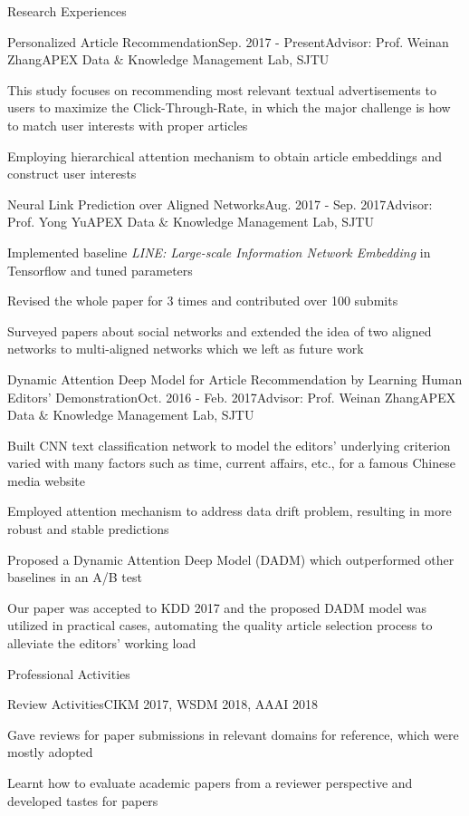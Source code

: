 \documentclass{resume} %
\begin{document}
\begin{rSection}{Research Experiences}
\begin{rSubsection}{Personalized Article Recommendation}{Sep. 2017 - Present}{Advisor: Prof. Weinan Zhang}{APEX Data $\&$ Knowledge Management Lab, SJTU}
\item This study focuses on recommending most relevant textual advertisements to users to maximize the Click-Through-Rate, in which the major challenge is how to match user interests with proper articles
\item Employing hierarchical attention mechanism to obtain article embeddings and construct user interests
\end{rSubsection}
\begin{rSubsection}{Neural Link Prediction over Aligned Networks}{Aug. 2017 - Sep. 2017}{Advisor: Prof. Yong Yu}{APEX Data $\&$ Knowledge Management Lab, SJTU}
\item Implemented baseline \emph{LINE: Large-scale Information Network Embedding} in Tensorflow and tuned parameters
\item Revised the whole paper for 3 times and contributed over 100 submits 
\item Surveyed papers about social networks and extended the idea of two aligned networks to multi-aligned networks which we left as future work
\end{rSubsection}
\begin{rSubsection}{Dynamic Attention Deep Model for Article Recommendation
by Learning Human Editors’ Demonstration}{Oct. 2016 - Feb. 2017}{Advisor: Prof. Weinan Zhang}{APEX Data $\&$ Knowledge Management Lab, SJTU}
\item Built CNN text classification network to model the editors' underlying criterion varied with many factors such as time, current affairs, etc., for a famous Chinese media website
\item Employed attention mechanism to address data drift problem, resulting in more robust and stable predictions
\item Proposed a Dynamic Attention Deep Model (DADM) which outperformed other baselines in an A/B test
\item Our paper was accepted to KDD 2017 and the proposed DADM model was utilized in practical cases, automating the quality article selection process to alleviate the editors' working load
\end{rSubsection}
\end{rSection}
\begin{rSection}{Professional Activities}
\begin{rSubsection}{Review Activities}{CIKM 2017, WSDM 2018, AAAI 2018}{}{}
\item Gave reviews for paper submissions in relevant domains for reference, which were mostly adopted
\item Learnt how to evaluate academic papers from a reviewer perspective and developed tastes for papers
\end{rSubsection}
\end{rSection}
\end{document}
